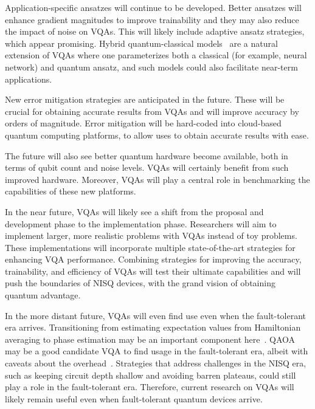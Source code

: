 \documentclass[prx,twocolumn,floatfix,superscriptaddress,longbibliography]{revtex4-1}
\newcommand{\<}{\langle}
\renewcommand{\>}{\rangle}
\begin{document}
Application-specific ansatzes will continue to be developed. Better ansatzes will enhance gradient magnitudes to improve trainability and they may also reduce the impact of noise on VQAs. This will likely include adaptive ansatz strategies, which appear promising. Hybrid quantum-classical models~\cite{verdon2019quantumVQT} are a natural extension of VQAs where one parameterizes both a classical (for example, neural network) and quantum ansatz, and such models could also facilitate near-term applications. 


New error mitigation strategies are anticipated in the future. These will be crucial for obtaining accurate results from VQAs and will improve accuracy by orders of magnitude. Error mitigation will be hard-coded into cloud-based quantum computing platforms, to allow uses to obtain accurate results with ease. 

The future will also see better quantum hardware become available, both in terms of qubit count and noise levels. VQAs will certainly benefit from such improved hardware. Moreover, VQAs will play a central role in benchmarking the capabilities of these new platforms. 


In the near future, VQAs will likely see a shift from the proposal and development phase to the implementation phase. Researchers will aim to implement
larger, more realistic problems with VQAs instead of toy problems. These implementations will incorporate multiple state-of-the-art strategies for enhancing VQA performance. Combining strategies for improving the accuracy, trainability, and efficiency of VQAs will test their ultimate capabilities and will push the boundaries of NISQ devices, with the grand vision of obtaining quantum advantage.

In the more distant future, VQAs will even find use even when the fault-tolerant era arrives. Transitioning from estimating expectation values from Hamiltonian averaging to phase estimation may be an important component here~\cite{wang2019accelerated}. QAOA may be a good candidate VQA to find usage in the fault-tolerant era, albeit with caveats about the overhead~\cite{sanders2020compilation}. Strategies that address challenges in the NISQ era, such as keeping circuit depth shallow and avoiding barren plateaus, could still play a role in the fault-tolerant era. Therefore, current research on VQAs will likely remain useful even when fault-tolerant quantum devices arrive. 
\end{document}
